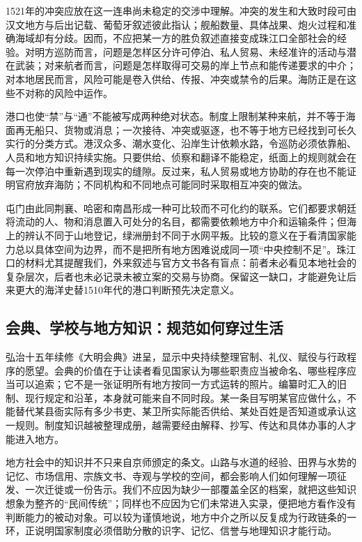 1521年的冲突应放在这一连串尚未稳定的交涉中理解。冲突的发生和大致时段可由汉文地方与后出记载、葡萄牙叙述彼此指认；舰船数量、具体战果、炮火过程和准确海域却有分歧。因而，不应把某一方的胜负叙述直接变成珠江口全部社会的经验。对明方巡防而言，问题是怎样区分许可停泊、私人贸易、未经准许的活动与潜在武装；对来航者而言，问题是怎样取得可交易的岸上节点和能传递要求的中介；对本地居民而言，风险可能是卷入供给、传报、冲突或禁令的后果。海防正是在这些不对称的风险中运作。

港口也使“禁”与“通”不能被写成两种绝对状态。制度上限制某种来航，并不等于海面再无船只、货物或消息；一次接待、冲突或驱逐，也不等于地方已经找到可长久实行的分类方式。港汊众多、潮水变化、沿岸生计依赖水路，令巡防必须依靠船、人员和地方知识持续实施。只要供给、侦察和翻译不能稳定，纸面上的规则就会在每一次停泊中重新遇到现实的缝隙。反过来，私人贸易或地方协助的存在也不能证明官府放弃海防；不同机构和不同地点可能同时采取相互冲突的做法。

屯门由此同荆襄、哈密和南昌形成一种可比较而不可化约的联系。它们都要求朝廷将流动的人、物和消息置入可处分的名目，都需要依赖地方中介和运输条件；但海上的辨认不同于山地登记，绿洲册封不同于水网平叛。比较的意义在于看清国家能力总以具体空间为边界，而不是把所有地方困难说成同一项“中央控制不足”。珠江口的材料尤其提醒我们，外来叙述与官方文书各有盲点：前者未必看见本地社会的复杂层次，后者也未必记录未被立案的交易与协商。保留这一缺口，才能避免让后来更大的海洋史替1510年代的港口判断预先决定意义。

\subsection{会典、学校与地方知识：规范如何穿过生活}

弘治十五年续修《大明会典》进呈，显示中央持续整理官制、礼仪、赋役与行政程序的愿望。会典的价值在于让读者看见国家认为哪些职责应当被命名、哪些程序应当可以追索；它不是一张证明所有地方按同一方式运转的照片。编纂时汇入的旧制、现行规定和沿革，本身就可能来自不同时段。某一条目写明某官应做什么，不能替代某县衙实际有多少书吏、某卫所实际能否供给、某处百姓是否知道或承认这一规则。制度知识越被整理成册，越需要经由解释、抄写、传达和具体办事的人才能进入地方。

地方社会中的知识并不只来自京师颁定的条文。山路与水道的经验、田界与水势的记忆、市场信用、宗族文书、寺观与学校的空间，都会影响人们如何理解一项征发、一次迁徙或一份告示。我们不应因为缺少一部覆盖全区的档案，就把这些知识想象为整齐的“民间传统”；同样也不应因为它们未常进入实录，便把地方看作没有判断能力的被动对象。可以较为谨慎地说，地方中介之所以反复成为行政链条的一环，正说明国家制度必须借助分散的识字、记忆、信誉与地理知识才能行动。

